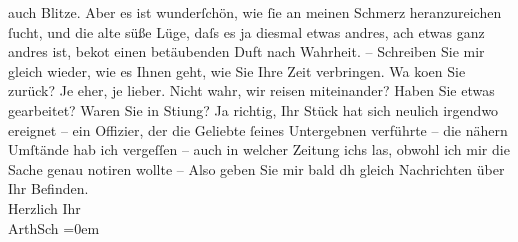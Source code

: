 \begin{ledgroupsized}[t]{13cm}
               auch Blitze. Aber es ist wunderſchön, wie ſie an meinen Schmerz heranzureichen ſucht,
               und die alte süße Lüge, daſs es ja diesmal etwas andres, ach etwas ganz andres ist,
                  beko{\geminationm}t {\pb}einen
               betäubenden Duft nach Wahrheit. – Schreiben Sie mir gleich wieder, wie es Ihnen geht,
               wie Sie Ihre Zeit verbringen. Wa{\geminationn} ko{\geminationm}en Sie zurück? Je eher, je lieber. Nicht wahr, wir
               reisen miteinander? Haben {\pb}Sie etwas
               gearbeitet? Waren Sie in Sti{\geminationm}ung? Ja richtig, Ihr Stück hat sich neulich
               irgendwo ereignet – ein Offizier, der die Geliebte ſeines Untergebnen verführte – die
               nähern Umſtände hab ich vergeſſen – auch {\pb}in
               welcher Zeitung ichs las, obwohl ich mir die Sache genau notiren wollte – \pend
           \pstart
           Also geben Sie mir bald dh gleich Nachrichten über Ihr Befinden. {\\[\baselineskip]}Herzlich
               Ihr {\\[\baselineskip]}\spacefill\mbox{ArthSch}\pend
           \leftskip=0em{}
         
         \endnumbering{}\end{ledgroupsized}\begin{anhang}\end{anhang}\newcommand{\dateiname}{L02951}\newcommand{\titel}{Arthur Schnitzler an Felix Salten, [10.? 9. 1891]}\newcommand{\editorInnen}{Martin Anton Müller und Laura Untner}
      